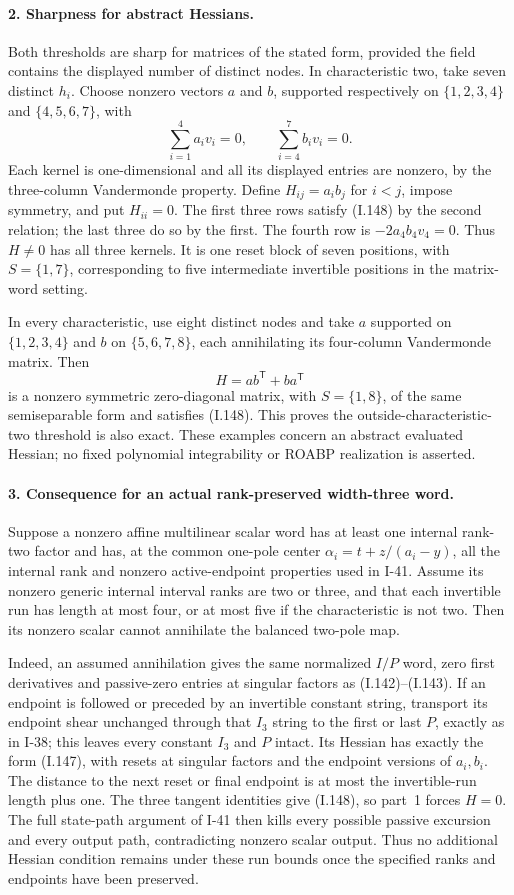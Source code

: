 \paragraph{2. Sharpness for abstract Hessians.}
Both thresholds are sharp for matrices of the stated form,
provided the field contains the displayed number of distinct
nodes. In characteristic two, take seven distinct $h_i$.
Choose nonzero vectors $a$ and $b$, supported respectively on
$\{1,2,3,4\}$ and $\{4,5,6,7\}$, with
\[
 \sum_{i=1}^4a_iv_i=0,
 \qquad\sum_{i=4}^7b_iv_i=0.
 \tag{I.152}
\]
Each kernel is one-dimensional and all its displayed entries
are nonzero, by the three-column Vandermonde property. Define
$H_{ij}=a_ib_j$ for $i<j$, impose symmetry, and put $H_{ii}=0$.
The first three rows satisfy (I.148) by the second relation;
the last three do so by the first. The fourth row is
$-2a_4b_4v_4=0$. Thus $H\ne0$ has all three kernels. It is
one reset block of seven positions, with $S=\{1,7\}$, corresponding to five
intermediate invertible positions in the matrix-word setting.

In every characteristic, use eight distinct nodes and take
$a$ supported on $\{1,2,3,4\}$ and $b$ on
$\{5,6,7,8\}$, each annihilating its four-column Vandermonde
matrix. Then
\[
 H=ab^{\mathsf T}+ba^{\mathsf T}
 \tag{I.153}
\]
is a nonzero symmetric zero-diagonal matrix, with $S=\{1,8\}$, of the same
semiseparable form and satisfies (I.148). This proves the
outside-characteristic-two threshold is also exact. These
examples concern an abstract evaluated Hessian; no fixed
polynomial integrability or ROABP realization is asserted.

\paragraph{3. Consequence for an actual rank-preserved width-three word.}
Suppose a nonzero affine multilinear scalar word has at least
one internal rank-two factor and has, at the common
one-pole center $\alpha_i=t+z/(a_i-y)$, all the internal rank
and nonzero active-endpoint properties used in I-41. Assume
its nonzero generic internal interval ranks are two or three,
and that each invertible run has length at most four, or at
most five if the characteristic is not two. Then its nonzero
scalar cannot annihilate the balanced two-pole map.

Indeed, an assumed annihilation gives the same normalized
$I/P$ word, zero first derivatives and passive-zero entries
at singular factors as (I.142)--(I.143). If an endpoint is
followed or preceded by an invertible constant string, transport
its endpoint shear unchanged through that $I_3$ string to the
first or last $P$, exactly as in I-38; this leaves every
constant $I_3$ and $P$ intact. Its Hessian has exactly
the form (I.147), with resets at singular factors and the
endpoint versions of $a_i,b_i$. The distance to the next reset
or final endpoint is at most the invertible-run length plus
one. The three tangent identities give (I.148), so part~1
forces $H=0$. The full state-path argument of I-41 then kills
every possible passive excursion and every output path,
contradicting nonzero scalar output. Thus no additional
Hessian condition remains under these run bounds once the
specified ranks and endpoints have been preserved.

